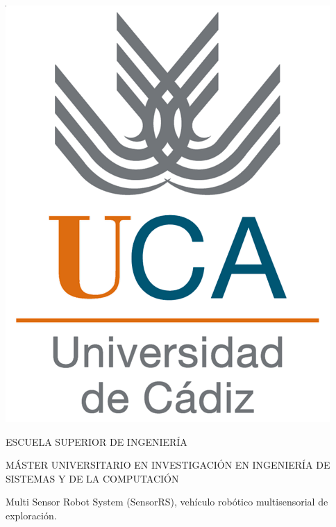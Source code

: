 

\pagestyle{empty}
\begin{center}

  \includegraphics[scale=0.2]{inicio/logo_uca.png} \\

  \vspace{2.0cm}

  \Large{ESCUELA SUPERIOR DE INGENIERÍA} \\

  \vspace{1.0cm}

  \large{MÁSTER UNIVERSITARIO EN INVESTIGACIÓN EN INGENIERÍA DE SISTEMAS Y DE LA COMPUTACIÓN} \\
  
  \vspace{2.0cm}

  \large{Multi Sensor Robot System (SensorRS), vehículo robótico multisensorial de exploración.} \\

  \vspace{1.0cm}

\end{center}

